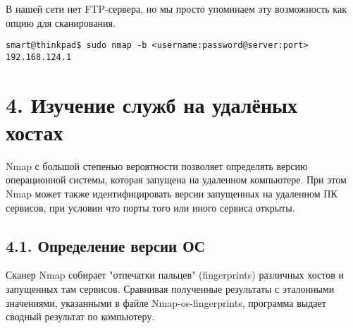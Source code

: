 В нашей сети нет FTP-сервера, но мы просто упоминаем эту возможность как опцию для сканирования.

\begin{Verbatim}[frame=single]
    smart@thinkpad$ sudo nmap -b <username:password@server:port> 192.168.124.1
\end{Verbatim}

\section*{4. Изучение служб на удалёных хостах}

Nmap с большой степенью вероятности позволяет определять версию операционной системы, которая запущена на удаленном компьютере. При этом Nmap может также идентифицировать версии запущенных на удаленном ПК сервисов, при условии что порты того или иного сервиса открыты.

\subsection*{4.1. Определение версии ОС}

Сканер Nmap собирает "отпечатки пальцев" (fingerprints) различных хостов и запущенных там сервисов. Сравнивая полученные результаты с эталонными значениями, указанными в файле Nmap-os-fingerprints, программа выдает сводный результат по компьютеру.

